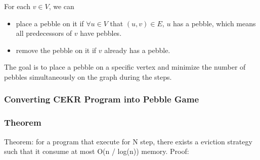 For each $v\in V$, we can
\begin{itemize}
    \item place a pebble on it if $\forall u\in V$ that $(u, v)\in E$, $u$ has a pebble, which means all predecessors of $v$ have pebbles.
    \item remove the pebble on it if $v$ already has a pebble.
\end{itemize}

The goal is to place a pebble on a specific vertex and minimize the number of pebbles simultaneously on the graph during the steps.
\subsubsection{Converting CEKR Program into Pebble Game}
\subsubsection{Theorem}
Theorem: for a program that execute for N step, there exists a eviction strategy such that it consume at most O(n / log(n)) memory.
Proof: 
